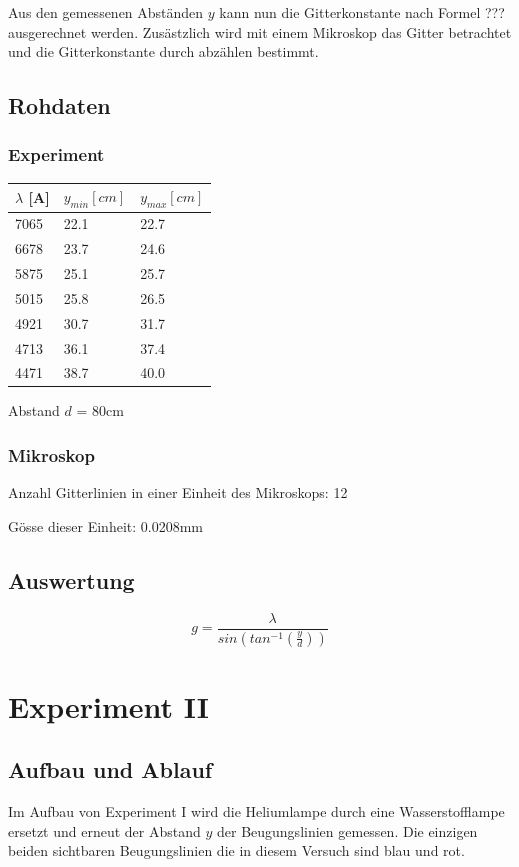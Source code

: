\documentclass[12pt,a4paper]{article}
\begin{document}
Aus den gemessenen Abst\"anden $y$ kann nun die Gitterkonstante nach Formel ??? ausgerechnet werden. Zus\"astzlich wird mit einem Mikroskop das Gitter betrachtet und die Gitterkonstante durch abz\"ahlen bestimmt.

\subsection*{Rohdaten}
\subsubsection*{Experiment}
\begin{tabular}{|l|l|l|}
\hline
$\lambda$ [A]&$y_{min} [cm]$&$y_{max} [cm]$\\
\hline
7065&22.1&22.7\\
6678&23.7&24.6\\
5875&25.1&25.7\\
5015&25.8&26.5\\
4921&30.7&31.7\\
4713&36.1&37.4\\
4471&38.7&40.0\\
\hline
\end{tabular}\vspace{10pt}

Abstand $d$ = 80cm

\subsubsection*{Mikroskop}
Anzahl Gitterlinien in einer Einheit des Mikroskops: 12

G\"osse dieser Einheit: 0.0208mm

\subsection*{Auswertung}
\[ g = \frac{\lambda}{sin(tan^{-1}(\frac{y}{d}))} \]

\section*{Experiment II}

\subsection*{Aufbau und Ablauf}
Im Aufbau von Experiment I wird die Heliumlampe durch eine Wasserstofflampe ersetzt und erneut der Abstand $y$ der Beugungslinien gemessen. Die einzigen beiden sichtbaren Beugungslinien die in diesem Versuch sind blau und rot.
\end{document}
